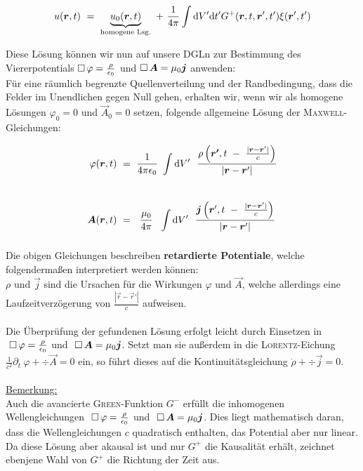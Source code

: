 \begin{equation*}
u(\vec{r},t) \ = \ \underbrace{u_0(\vec{r},t)}_{\text{homogene Lsg.}} \ + \ \frac{1}{4\pi}\int\d V' \d t' G^+(\vec{r},t,\vec{r}',t')\xi (\vec{r}',t')
\end{equation*}

Diese Lösung können wir nun auf unsere DGLn zur Bestimmung des Viererpotentials $\mathop{{}\Box}\nolimits\varphi = \frac{\rho}{\epsilon_0}$ und $\mathop{{}\Box}\nolimits\bm{A}= \mu_0\bm{j}$ anwenden:\\
Für eine räumlich begrenzte Quellenverteilung und der Randbedingung, dass die Felder im Unendlichen gegen Null gehen, erhalten wir, wenn wir als homogene Lösungen $\varphi_0=0$ und $\vec{A}_0=0$ setzen, folgende allgemeine Lösung der \textsc{Maxwell}-Gleichungen:

\begin{align*}
\varphi(\vec{r},t)  \ &= \ \frac{1}{4\pi\epsilon_0} \ \Int{}{}{V'} \ \frac{\rho\left(\vec{r'}, t \ - \ \frac{|\vec{r}-\vec{r}'|}{c}\right)}{|\vec{r}-\vec{r}'|}\\
\ \\
\vec{A}(\vec{r},t)  \ &= \ \ \frac{\mu_0}{4\pi} \ \ \Int{}{}{V'} \ \frac{\vec{j}\left(\vec{r}',t \ - \ \frac{|\vec{r}-\vec{r}'|}{c}\right)}{|\vec{r}-\vec{r}'|} 
\end{align*}

Die obigen Gleichungen beschreiben \textbf{retardierte Potentiale}, welche folgendermaßen interpretiert werden können:\\
$\rho$ und $\vec{j}$ sind die Ursachen für die Wirkungen $\varphi$ und $\vec{A}$, welche allerdings eine Laufzeitverzögerung von $\frac{|\vec{r}-\vec{r}'|}{c}$ aufweisen.\\
\ \\

Die Überprüfung der gefundenen Lösung erfolgt leicht durch Einsetzen in $ \ \Dalembert\varphi=\frac{\rho}{\epsilon_0}$ und $\ \mathop{{}\Box}\nolimits\bm{A} = \mu_0\bm{j}$. Setzt man sie außerdem in die \textsc{Lorentz}-Eichung $\frac{1}{c^2}\partial_t \ \varphi + \div\vec{A} =0$ ein, so führt dieses auf die Kontinuitätsgleichung $\dot{\rho} + \div\vec{j}=0$.\\
\ \\
\underline{Bemerkung:}\\
Auch die avancierte \textsc{Green}-Funktion $G^-$ erfüllt die inhomogenen Wellengleichungen $\ \Dalembert\varphi=\frac{\rho}{\epsilon_0}$ und $\ \mathop{{}\Box}\nolimits\bm{A} = \mu_0\bm{j}$. Dies liegt mathematisch daran, dass die Wellengleichungen $c$ quadratisch enthalten, das Potential aber nur linear. Da diese Lösung aber akausal ist und nur $G^+$ die Kausalität erhält, zeichnet ebenjene Wahl von $G^+$ die Richtung der Zeit aus.


